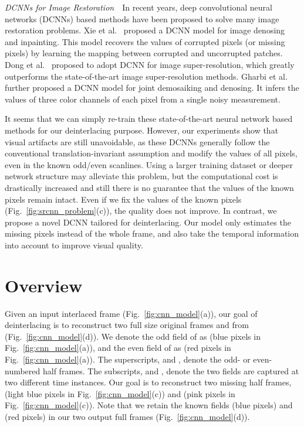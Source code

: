 \documentclass[acmtog]{acmart}
\begin{document}
\vspace{0.15in}

\noindent\emph{DCNNs for Image Restoration}\,\,\,\, In recent years, 
deep convolutional neural networks (DCNNs) based methods have been proposed to solve 
many image restoration problems.
Xie et al.~ proposed a DCNN model for
image denosing and inpainting. This model recovers the values of corrupted
pixels (or missing pixels) by learning the mapping between corrupted and
uncorrupted patches. Dong et al.~ proposed to adopt
DCNN for image super-resolution, which greatly outperforms the state-of-the-art
image super-resolution methods. Gharbi et al.~ further
proposed a DCNN model for joint demosaiking and denosing. It infers
the values of three color channels of each pixel from a single noisy
measurement.



It seems that we can simply re-train these state-of-the-art 
neural network based methods for our deinterlacing purpose. 
However, our experiments show that visual artifacts are still unavoidable, as 
these DCNNs generally follow the conventional translation-invariant assumption and
modify the values of all pixels, even in the known odd/even scanlines.  Using a larger
training dataset or deeper network structure may alleviate this problem, but the
computational cost is drastically increased and still there is no guarantee 
that the values of the known pixels remain intact. 
Even if we fix the values of the known pixels (Fig.~\ref{fig:srcnn_problem}(c)), 
the quality does not improve. 
In contrast, we propose a novel DCNN tailored for deinterlacing.
Our model only estimates the missing pixels instead of the whole frame, and also
take the temporal information into account to improve visual quality.

 \section{Overview}
Given an input interlaced frame  (Fig.~\ref{fig:cnn_model}(a)),  our
goal of deinterlacing is to reconstruct two full size original frames
 and  from 
(Fig.~\ref{fig:cnn_model}(d)). We denote the odd field of  as
 (blue pixels in Fig.~\ref{fig:cnn_model}(a)), and
the even field of  as  (red pixels in
Fig.~\ref{fig:cnn_model}(a)). The superscripts,  and ,
denote the odd- or even-numbered half frames. The subscripts,  and ,
denote the two fields are captured at two different time instances. Our goal is
to reconstruct two missing half frames,  (light blue
pixels in Fig.~\ref{fig:cnn_model}(c)) and  (pink
pixels in Fig.~\ref{fig:cnn_model}(c)). Note that we retain the known fields
  (blue pixels) and 
(red pixels) in our two output full frames (Fig.~\ref{fig:cnn_model}(d)).
\end{document}
